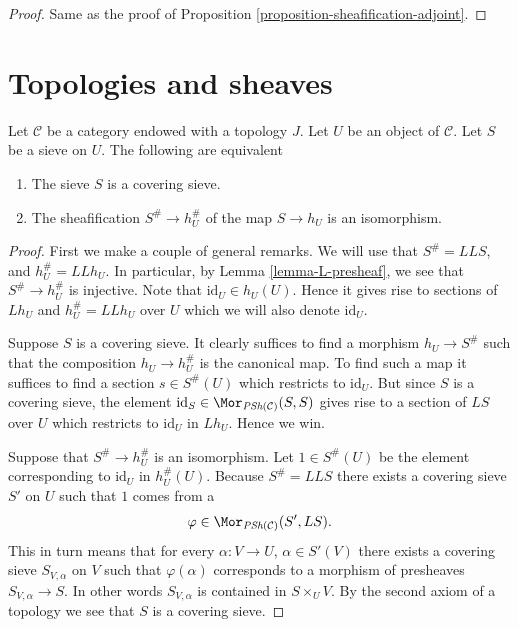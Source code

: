 \begin{proof}
Same as the proof of Proposition \ref{proposition-sheafification-adjoint}.
\end{proof}














\section{Topologies and sheaves}
\label{section-topology-and-sheaves}

\begin{lemma}
\label{lemma-sieve-sheafification}
Let $\mathcal{C}$ be a category endowed with a topology $J$.
Let $U$ be an object of $\mathcal{C}$.
Let $S$ be a sieve on $U$. The following are equivalent
\begin{enumerate}
\item The sieve $S$ is a covering sieve.
\item The sheafification $S^\# \to h_U^\#$
of the map $S \to h_U$ is an isomorphism.
\end{enumerate}
\end{lemma}

\begin{proof}
First we make a couple of general remarks.
We will use that $S^\# = LLS$, and $h_U^\# = LLh_U$.
In particular, by Lemma \ref{lemma-L-presheaf}, we see that
$S^\# \to h_U^\#$ is injective. Note that
$\text{id}_U \in h_U(U)$. Hence it gives rise to
sections of $Lh_U$ and $h_U^\# = LLh_U$ over $U$ which
we will also denote $\text{id}_U$.

\medskip\noindent
Suppose $S$ is a covering sieve. It clearly suffices to
find a morphism $h_U \to S^\#$ such that the composition
$h_U \to h_U^\#$ is the canonical map. To find such a map
it suffices to find a section $s \in S^\#(U)$ which restricts
to $\text{id}_U$. But since $S$ is a
covering sieve, the element
$\text{id}_S \in \Mor_{\textit{PSh}(\mathcal{C})}(S, S)$
gives rise to a section of $LS$ over $U$ which restricts to
$\text{id}_U$ in $Lh_U$. Hence we win.

\medskip\noindent
Suppose that $S^\# \to h_U^\#$ is an isomorphism.
Let $1 \in S^\#(U)$ be the element corresponding to
$\text{id}_U$ in $h_U^\#(U)$. Because $S^\# = LLS$
there exists a covering sieve $S'$ on $U$ such that
$1$ comes from a
$$
\varphi \in \Mor_{\textit{PSh}(\mathcal{C})}(S', LS).
$$
This in turn means that for every $\alpha : V \to U$,
$\alpha\in S'(V)$ there exists a covering sieve $S_{V, \alpha}$
on $V$ such that $\varphi(\alpha)$ corresponds to
a morphism of presheaves $S_{V, \alpha} \to S$. In other words
$S_{V, \alpha}$ is contained in $S \times_U V$. By the second
axiom of a topology we see that $S$ is a covering sieve.
\end{proof}

